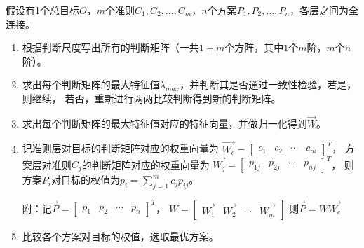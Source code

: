 \documentclass[a4paper,12pt]{article}
\begin{document}
假设有1个总目标$O$，$m$个准则$C_1,C_2,\dots,C_m$，$n$个方案$P_1,P_2,\dots,P_n$，各层之间为全连接。
\begin{enumerate}[itemsep=0pt,parsep=0pt]
    \item 根据判断尺度写出所有的判断矩阵（一共$1+m$个方阵，其中$1$个$m$阶，$m$个$n$阶）。
    \item 求出每个判断矩阵的最大特征值$\lambda_{max}$，并判断其是否通过一致性检验，若是，则继续，
    若否，重新进行两两比较判断得到新的判断矩阵。
    \item 求出每个判断矩阵的最大特征值对应的特征向量，并做归一化得到$\overrightarrow W$。
    \item 记准则层对目标的判断矩阵对应的权重向量为
    $\overrightarrow {W_c}=\begin{bmatrix}c_1 & c_2 & \cdots & c_m\end{bmatrix}^T$，
    方案层对准则$C_j$的判断矩阵对应的权重向量为
    $\overrightarrow {W_j}=\begin{bmatrix}p_{1j} & p_{2j} & \cdots & p_{nj}\end{bmatrix}^T$，
    则方案$P_i$对目标的权值为$p_i=\sum_{j=1}^mc_jp_{ij}$。

    附：记$\overrightarrow P=\begin{bmatrix}p_1 & p_2 & \cdots & p_n\end{bmatrix}^T$，
    $W=\begin{bmatrix}\overrightarrow{W_1} & \overrightarrow{W_2} & \cdots & \overrightarrow{W_m}\end{bmatrix}$
    则$\overrightarrow P=W\overrightarrow{W_c}$
    \item 比较各个方案对目标的权值，选取最优方案。
\end{enumerate} 
\end{document}

